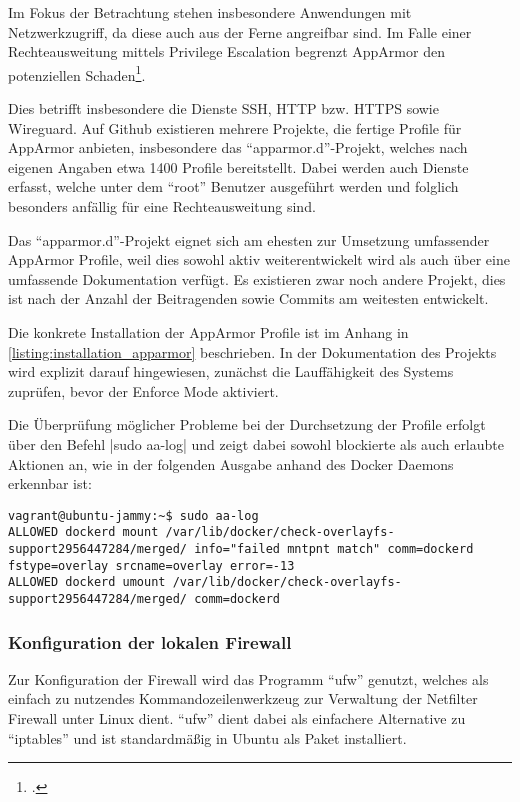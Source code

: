 Im Fokus der Betrachtung stehen insbesondere Anwendungen mit Netzwerkzugriff, da diese auch aus der Ferne angreifbar sind. Im Falle einer Rechteausweitung mittels Privilege Escalation begrenzt AppArmor den potenziellen Schaden\footcite[Vgl.][]{hutchinsIntelligenceDrivenComputerNetwork}.

Dies betrifft insbesondere die Dienste \ac{SSH}, \ac{HTTP} bzw. \ac{HTTPS} sowie Wireguard. Auf Github existieren mehrere Projekte, die fertige Profile für AppArmor anbieten, insbesondere das \enquote{apparmor.d}-Projekt, welches nach eigenen Angaben etwa 1400 Profile bereitstellt. Dabei werden auch Dienste erfasst, welche unter dem \enquote{root} Benutzer ausgeführt werden und folglich besonders anfällig für eine Rechteausweitung sind.

Das \enquote{apparmor.d}-Projekt eignet sich am ehesten zur Umsetzung umfassender AppArmor Profile, weil dies sowohl aktiv weiterentwickelt wird als auch über eine umfassende Dokumentation verfügt. Es existieren zwar noch andere Projekt, dies ist nach der Anzahl der Beitragenden sowie Commits am weitesten entwickelt.

Die konkrete Installation der AppArmor Profile ist im Anhang in \autoref{listing:installation_apparmor} beschrieben. In der Dokumentation des Projekts wird explizit darauf hingewiesen, zunächst die Lauffähigkeit des Systems zuprüfen, bevor der Enforce Mode aktiviert.

Die Überprüfung möglicher Probleme bei der Durchsetzung der Profile erfolgt über den Befehl |sudo aa-log|
und zeigt dabei sowohl blockierte als auch erlaubte Aktionen an, wie in der folgenden Ausgabe anhand des Docker Daemons erkennbar ist:

\begin{verbatim}
vagrant@ubuntu-jammy:~$ sudo aa-log 
ALLOWED dockerd mount /var/lib/docker/check-overlayfs-support2956447284/merged/ info="failed mntpnt match" comm=dockerd fstype=overlay srcname=overlay error=-13
ALLOWED dockerd umount /var/lib/docker/check-overlayfs-support2956447284/merged/ comm=dockerd
\end{verbatim}

\subsubsection{Konfiguration der lokalen Firewall}

Zur Konfiguration der Firewall wird das Programm \enquote{ufw} genutzt, welches als einfach zu nutzendes Kommandozeilenwerkzeug zur Verwaltung der Netfilter Firewall unter Linux dient. \enquote{ufw} dient dabei als einfachere Alternative zu \enquote{iptables} und ist standardmäßig in Ubuntu als Paket installiert.

